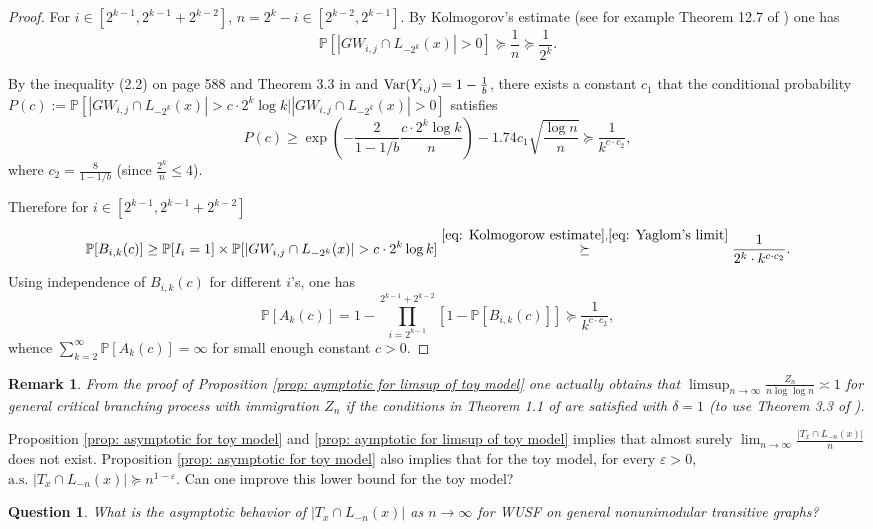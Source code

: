 \documentclass[12pt]{article}
\newtheorem{question}[theorem]{Question}
\newtheorem{remark}[theorem]{Remark}
\numberwithin{equation}{section}
\newcommand{\be}{\begin{equation}}
\newcommand{\ee}{\end{equation}}
\def\as {\mathrm{a.s.}}
\newcommand{\1}{\mathbf{1}}
\begin{document}
\begin{proof}
 	For $i\in [2^{k-1},2^{k-1}+2^{k-2}]$, $n=2^k-i\in [2^{k-2},2^{k-1}]$. By  Kolmogorov's estimate (see for example Theorem 12.7 of \cite{LP2016}) one has 
 	\be\label{eq: Kolmogorow estimate}
 	\mathbb{P}[|GW_{i,j}\cap L_{-2^k}(x)|> 0]\succeq \frac{1}{n}\succeq\frac{1}{2^k}.
 	\ee
 	
 	By the inequality (2.2) on page 588 and Theorem 3.3 in \cite{PekozRollin2011} and $\textnormal{Var}(Y_{i,j})=1-\frac{1}{b}$, there exists a constant $c_{1}$ that the conditional probability $P(c):=\mathbb{P}[|GW_{i,j}\cap L_{-2^k}(x)|> c\cdot 2^k\log k\big| |GW_{i,j}\cap L_{-2^k}(x)|> 0]$ satisfies
 	\be\label{eq: Yaglom's limit}
 	P(c)
 	\geq \exp(-\frac{2}{1-1/b}\frac{c\cdot2^k\log k}{n})-1.74c_{1}\sqrt{\frac{\log n}{n}}
 	\succeq\frac{1}{k^{c\cdot c_{2}}},
 	\ee
 	where $c_{2}=\frac{8}{1-1/b}$ (since $\frac{2^k}{n}\leq 4$).
 	
 	Therefore for $i\in [2^{k-1},2^{k-1}+2^{k-2}]$
 	\[
 	\mathbb{P}[B_{i,k}(c)]\geq \mathbb{P}[I_i=1]\times\mathbb{P}[|GW_{i,j}\cap L_{-2^k}(x)|> c\cdot 2^k\log k]\stackrel{\eqref{eq: Kolmogorow estimate}, \eqref{eq: Yaglom's limit}}{\succeq} \frac{1}{2^k\cdot k^{c\cdot c_{2}}}.
 	\]
 	Using independence of $B_{i,k}(c)$ for different $i$'s, one has 
 	\[
 	\mathbb{P}[A_{k}(c)]=1-\prod_{i=2^{k-1}}^{2^{k-1}+2^{k-2}}[1-\mathbb{P}[B_{i,k}(c)]]\succeq \frac{1}{k^{c\cdot c_{2}}},
 	\]
 	whence $\sum_{k=2}^{\infty}\mathbb{P}[A_k(c)]=\infty$ for small enough constant $c>0$.
 \end{proof}
 \begin{remark}
 	From the proof of Proposition \ref{prop: aymptotic for limsup of toy model} one actually obtains  that $\limsup_{n\rightarrow\infty}\frac{Z_n}{n\log\log n}\asymp 1$ for  general critical branching process  with immigration $Z_n$ if the  conditions in Theorem 1.1 of \cite{Wei1991} are satisfied with $\delta=1$ (to use Theorem 3.3 of \cite{PekozRollin2011}). 
 	
 	
 \end{remark}
 
 Proposition \ref{prop: asymptotic for toy model} and \ref{prop: aymptotic for limsup of toy model} implies that almost surely $\lim_{n\rightarrow\infty}\frac{|T_x\cap L_{-n}(x)|}{n}$ does not exist. Proposition \ref{prop: asymptotic for toy model} also implies that for the toy model, for every $\varepsilon>0$, $\as\,\,  |T_x\cap L_{-n}(x)|\succeq n^{1-\varepsilon}$. Can one improve this lower bound for the toy model?
 
 
 
 \begin{question}\label{ques: asymotopic behavior of intersection with a lower level for general case}
 	What is the asymptotic behavior of $|T_x\cap L_{-n}(x)|$ as $n\rightarrow\infty$ for WUSF on general nonunimodular transitive graphs?
 \end{question}
 
\end{document}
